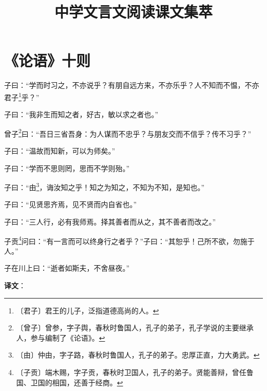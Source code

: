 \documentclass[12pt,UTF-8,openany,a4]{ctexbook}
\title{\zihao{0} \bfseries 中学文言文阅读课文集萃}
\author{}
\date{}
\begin{document}
\maketitle
\tableofcontents
\newpage

\chapter{《论语》十则}

\begin{large}
    
    子曰：“学而时习之，不亦说乎？有朋自远方来，不亦乐乎？人不知而不愠，不亦君子\footnote{〔君子〕\yiwen 君王的儿子，泛指道德高尚的人。}乎？”
    
    子曰：“我非生而知之者，好古，敏以求之者也。”
    
    曾子\footnote{〔曾子〕\yiwen 曾参，字子舆，春秋时鲁国人，孔子的弟子，孔子学说的主要继承人，参与编制了《论语》。}曰：“吾日三省吾身：为人谋而不忠乎？与朋友交而不信乎？传不习乎？”
    
    子曰：“温故而知新，可以为师矣。”
    
    子曰：“学而不思则罔，思而不学则殆。”
    
    子曰：“由\footnote{〔由〕\yiwen 仲由，字子路，春秋时鲁国人，孔子的弟子。忠厚正直，力大勇武。}，诲汝知之乎！知之为知之，不知为不知，是知也。”
    
    子曰：“见贤思齐焉，见不贤而内自省也。”
    
    子曰：“三人行，必有我师焉。择其善者而从之，其不善者而改之。”
    
    子贡\footnote{〔子贡〕\yiwen 端木赐，字子贡，春秋时卫国人，孔子的弟子。贤能善辩，曾任鲁国、卫国的相国，还善于经商。}问曰：“有一言而可以终身行之者乎？”子曰：“其恕乎！己所不欲，勿施于人。”
    
    子在川上曰：“逝者如斯夫，不舍昼夜。”

\end{large}


\newpage

\begin{Large}
   \noindent \textbf{译文}：
\end{Large}

\vspace{1em}
\end{document}

